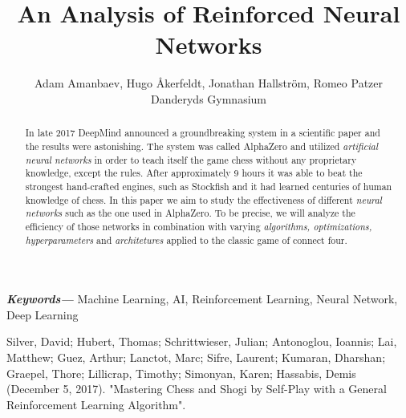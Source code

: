 \documentclass[a4paper]{article}
\title{An Analysis of Reinforced Neural Networks}
\author{Adam Amanbaev, Hugo Åkerfeldt, Jonathan Hallström, Romeo Patzer \\ 
        \small Danderyds Gymnasium \\
}
\providecommand{\keywords}[1]
{ 
    \small
    \textbf{\textit{Keywords---}} #1
}
\begin{document}
\maketitle

\begin{abstract}
    In late 2017 DeepMind announced a groundbreaking system in a scientific paper \cite{AlphaZeroPaper} and the results were astonishing. The system was called AlphaZero and utilized \emph{artificial neural networks} in order to teach itself the game chess without any proprietary knowledge, except the rules. After approximately 9 hours it was able to beat the strongest hand-crafted engines, such as Stockfish and it had learned centuries of human knowledge of chess. In this paper we aim to study the effectiveness of different \emph{neural networks} such as the one used in AlphaZero. To be precise, we will analyze the efficiency of those networks in combination with varying \emph{algorithms, optimizations, hyperparameters} and \emph {architetures} applied to the classic game of connect four. 
\end{abstract} \hspace{10pt}

\keywords{Machine Learning, AI, Reinforcement Learning, Neural Network, Deep Learning}

\begin{thebibliography}{9}
Silver, David; Hubert, Thomas; Schrittwieser, Julian; Antonoglou, Ioannis; Lai, Matthew; Guez, Arthur; Lanctot, Marc; Sifre, Laurent; Kumaran, Dharshan; Graepel, Thore; Lillicrap, Timothy; Simonyan, Karen; Hassabis, Demis (December 5, 2017). "Mastering Chess and Shogi by Self-Play with a General Reinforcement Learning Algorithm".

\end{thebibliography}
\end{document}
